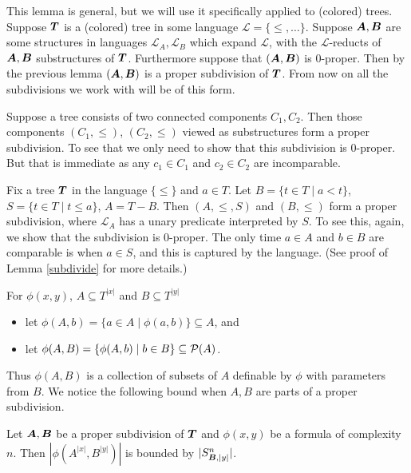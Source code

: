 \documentclass{amsart}
\DeclareMathOperator{\TT}{\boldface T}
\DeclareMathOperator{\A}{\boldface A}
\DeclareMathOperator{\B}{\boldface B}
\renewcommand{\LL}{\mathcal L}
\begin{document}
This lemma is general, but we will use it specifically applied to (colored) trees.
Suppose $\TT$ is a (colored) tree in some language $\LL = \{\leq, \ldots\}$.
Suppose $\A, \B$ are some structures in languages $\LL_A, \LL_B$ which expand $\LL$, with the $\LL$-reducts of $\A, \B$ substructures of $\TT$.
Furthermore suppose that $(\A, \B)$ is 0-proper.
Then by the previous lemma $(\A, \B)$ is a proper subdivision of $\TT$.
From now on all the subdivisions we work with will be of this form.

\begin{Example} \label{ex_disc}
  Suppose a tree consists of two connected components $C_1, C_2$.
  Then those components $(C_1, \leq)$, $(C_2, \leq)$ viewed as substructures form a proper subdivision.
  To see that we only need to show that this subdivision is 0-proper.
  But that is immediate as any $c_1 \in C_1$ and $c_2 \in C_2$ are incomparable.
\end{Example}

\begin{Example} \label{ex_cone}
  Fix a tree $\TT$ in the language $\{\leq\}$ and $a \in T$. Let $B = \{t \in T \mid a < t\}$, $S = \{t \in T \mid t \leq a\}$, $A = T - B$. Then $(A, \leq, S)$ and $(B, \leq)$ form a proper subdivision, where $\LL_A$ has a unary predicate interpreted by $S$.
  To see this, again, we show that the subdivision is 0-proper.
  The only time $a \in A$ and $b \in B$ are comparable is when $a \in S$, and this is captured by the language.
  (See proof of Lemma \ref{subdivide} for more details.)
\end{Example}

\begin{Definition} For $\phi(x, y)$, $A \subseteq T^{|x|}$ and $B \subseteq T^{|y|}$
  \begin{itemize}
  \item let $\phi(A, b) = \{a \in A \mid \phi(a, b)\} \subseteq A$, and 
  \item let $\phi(A, B) = \{\phi(A, b) \mid b \in B\} \subseteq \mathcal P(A)$.	
  \end{itemize}
\end{Definition}
Thus $\phi(A, B)$ is a collection of subsets of $A$ definable by $\phi$ with parameters from $B$. We notice the following bound when $A, B$ are parts of a proper subdivision.

\begin{Corollary} \label{cor_type_count}
  Let $\A, \B$ be a proper subdivision of $\TT$ and $\phi(x,y)$ be a formula of complexity $n$. Then $|\phi(A^{|x|}, B^{|y|})|$ is bounded by $|S^n_{\B, |y|}|$.
\end{Corollary}
\end{document}
